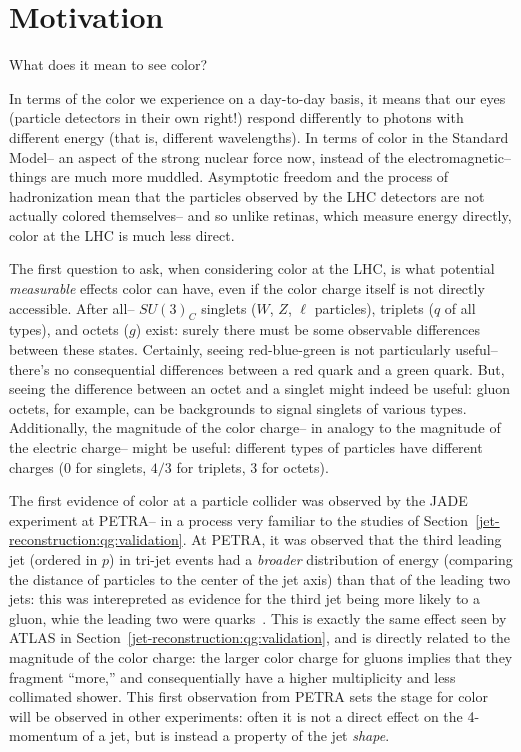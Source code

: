 \label{chapter:color}
\section{Motivation}

What does it mean to see color?

In terms of the color we experience on a day-to-day basis, it means that our eyes (particle detectors in their own right!) respond differently to photons with different energy (that is, different wavelengths). In terms of color in the Standard Model-- an aspect of the strong nuclear force now, instead of the electromagnetic-- things are much more muddled. Asymptotic freedom and the process of hadronization mean that the particles observed by the LHC detectors are not actually colored themselves-- and so unlike retinas, which measure energy directly, color at the LHC is much less direct.

The first question to ask, when considering color at the LHC, is what potential \textit{measurable} effects color can have, even if the color charge itself is not directly accessible. After all-- $SU(3)_C$ singlets ($W$, $Z$, $\ell$ particles), triplets ($q$ of all types), and octets ($g$) exist: surely there must be some observable differences between these states. Certainly, seeing red-blue-green is not particularly useful-- there's no consequential differences between a red quark and a green quark. But, seeing the difference between an octet and a singlet might indeed be useful: gluon octets, for example, can be backgrounds to signal singlets of various types. Additionally, the magnitude of the color charge-- in analogy to the magnitude of the electric charge-- might be useful: different types of particles have different charges (0 for singlets, $4/3$ for triplets, $3$ for octets). 

The first evidence of color at a particle collider was observed by the JADE experiment at PETRA-- in a process very familiar to the studies of Section~\ref{jet-reconstruction:qg:validation}. At PETRA, it was observed that the third leading jet (ordered in $p$) in tri-jet events had a \textit{broader} distribution of energy (comparing the distance of particles to the center of the jet axis) than that of the leading two jets: this was interepreted as evidence for the third jet being more likely to a gluon, whie the leading two were quarks~\cite{Bartel:1983ii}. This is exactly the same effect seen by ATLAS in Section~\ref{jet-reconstruction:qg:validation}, and is directly related to the magnitude of the color charge: the larger color charge for gluons implies that they fragment ``more,'' and consequentially have a higher multiplicity and less collimated shower. This first observation from PETRA sets the stage for color will be observed in other experiments: often it is not a direct effect on the 4-momentum of a jet, but is instead a property of the jet \textit{shape}. 

